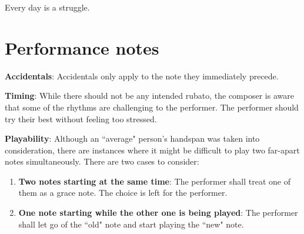 \documentclass{article}
\begin{document}
Every day is a struggle.
\clearpage
\section*{Performance notes}
{\bfseries Accidentals}: Accidentals only apply to the note they
immediately precede.

{\bfseries Timing}: While there should not be any intended rubato, the
composer is aware that some of the rhythms are challenging to the
performer. The performer should try their best without feeling too
stressed.

{\bfseries Playability}: Although an ``average" person's handspan was
taken into consideration, there are instances where it might be
difficult to play two far-apart notes simultaneously. There are two
cases to consider:
\begin{enumerate}
\item {\bfseries Two notes starting at the same time}: The performer
shall treat one of them as a grace note. The choice is left for the
performer.
\item {\bfseries One note starting while the other one is being played}:
The performer shall let go of the ``old" note and start playing the
``new" note.
\end{enumerate}
\end{document}
